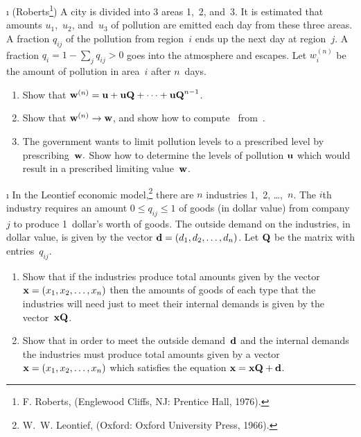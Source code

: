 \begin{LJSItem}
\i\label{exer 11.2.20} (Roberts\footnote{F. Roberts,  (Englewood Cliffs, NJ: Prentice Hall, 1976).}) A
city is
divided into 3 areas 1,~2, and~3.  It is estimated that amounts $u_1$,~$u_2$,
and~$u_3$ of
pollution are emitted each day from these three areas.  A fraction $q_{ij}$ of
the pollution from region~$i$ ends up the next day at region~$j$.  A fraction
$q_i = 1 - \sum_j q_{ij} > 0$ goes into the atmosphere and escapes.  Let
$w_i^{(n)}$ be the amount of pollution in area~$i$ after $n$~days.
\begin{enumerate}

\item Show that ${\mbox{\bf w}\/}^{(n)} = {\mbox{\bf u}\/} + {\mbox{\bf u}\/} {\mbox{\bf Q}\/} +\cdots +
{\mbox{\bf u}\/}{\mbox{\bf Q}\/}^{n - 1}$.

\item Show that ${\mbox{\bf w}\/}^{(n)} \to {\mbox{\bf w}\/}$, and show how to compute 
~from~.
 
\item The government wants to limit pollution levels to a prescribed level by
prescribing~${\mbox{\bf w}\/}.$  Show how to determine the levels of pollution ${\mbox{\bf u}\/}$
which would result in a prescribed limiting value~${\mbox{\bf w}\/}$.
\end{enumerate}

\i\label{exer 11.2.21} In the Leontief economic model,\footnote{W.~W. Leontief, 
 (Oxford: Oxford University Press, 1966).} there
are
$n$ industries 1,~2, \ldots,~$n$.  The $i$th industry requires an amount $0
\leq
q_{ij} \leq 1$ of goods (in dollar value) from company~$j$ to produce
1~dollar's worth of goods.  The outside demand on the industries, in dollar
value, is given by the vector ${\mbox{\bf d}\/} = (d_1,d_2,\ldots,d_n)$.  Let ${\mbox{\bf Q}\/}$
be the matrix with entries~$q_{ij}$.
\begin{enumerate}

\item Show that if the industries produce total amounts given by the vector
${\mbox{\bf x}\/} = (x_1,x_2,\ldots,x_n)$ then the amounts of goods of each type that
the
industries will need just to meet their internal demands is given by the
vector~${\mbox{\bf x}\/} {\mbox{\bf Q}\/}$.

\item Show that in order to meet the outside demand~${\mbox{\bf d}\/}$ and the internal
demands the industries must produce total amounts given by a vector ${\mbox{\bf x}\/} =
(x_1,x_2,\ldots,x_n)$ which satisfies the equation ${\mbox{\bf x}\/} = {\mbox{\bf x}\/} {\mbox{\bf Q}\/} +
{\mbox{\bf d}\/}$.


\end{enumerate}
\end{LJSItem}
